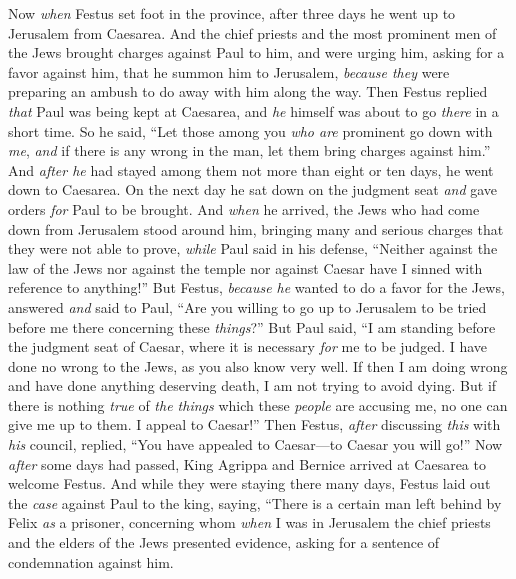 \begin{biblechapter} %
 Now \textit{when} Festus set foot in the province, after three days he went up to Jerusalem from Caesarea.
\verse And the chief priests and the most prominent men of the Jews brought charges against Paul to him, and were urging him,
\verse asking for a favor against him, that he summon him to Jerusalem, \textit{because they} were preparing an ambush to do away with him along the way.
\verse Then Festus replied \textit{that} Paul was being kept at Caesarea, and \textit{he} himself was about to go \textit{there} in a short time.
\verse So he said, “Let those among you \textit{who are} prominent go down with \textit{me}, \textit{and} if there is any wrong in the man, let them bring charges against him.”
\verse And \textit{after he} had stayed among them not more than eight or ten days, he went down to Caesarea. On the next day he sat down on the judgment seat \textit{and} gave orders \textit{for} Paul to be brought.
\verse And \textit{when} he arrived, the Jews who had come down from Jerusalem stood around him, bringing many and serious charges that they were not able to prove,
\verse \textit{while} Paul said in his defense, “Neither against the law of the Jews nor against the temple nor against Caesar have I sinned with reference to anything!”
\verse But Festus, \textit{because he} wanted to do a favor for the Jews, answered \textit{and} said to Paul, “Are you willing to go up to Jerusalem to be tried before me there concerning these \textit{things}?”
\verse But Paul said, “I am standing before the judgment seat of Caesar, where it is necessary \textit{for} me to be judged. I have done no wrong to the Jews, as you also know very well.
\verse If then I am doing wrong and have done anything deserving death, I am not trying to avoid dying. But if there is nothing \textit{true} of \textit{the things} which these \textit{people} are accusing me, no one can give me up to them. I appeal to Caesar!”
\verse Then Festus, \textit{after} discussing \textit{this} with \textit{his} council, replied, “You have appealed to Caesar—to Caesar you will go!”
 Now \textit{after} some days had passed, King Agrippa and Bernice arrived at Caesarea to welcome Festus.
\verse And while they were staying there many days, Festus laid out the \textit{case} against Paul to the king, saying, “There is a certain man left behind by Felix \textit{as} a prisoner,
\verse concerning whom \textit{when} I was in Jerusalem the chief priests and the elders of the Jews presented evidence, asking for a sentence of condemnation against him.

\end{biblechapter}

